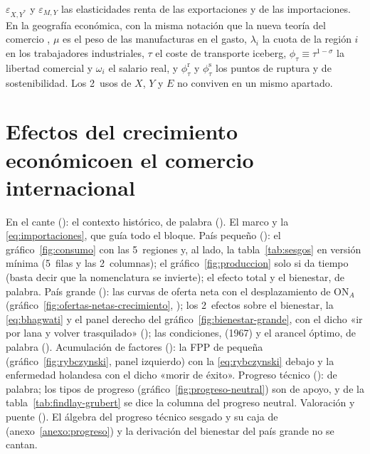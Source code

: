 \documentclass[11pt]{article}
\begin{document}
\begin{anotaciones}
$\varepsilon_{X,Y^*}$ y $\varepsilon_{M,Y}$ las elasticidades renta de las exportaciones y de las importaciones. En la geografía económica, con la misma notación que la nueva teoría del comercio , $\mu$ es el peso de las manufacturas en el gasto, $\lambda_i$ la cuota de la región $i$ en los trabajadores industriales, $\tau$ el coste de transporte iceberg, $\phi_\tau\equiv\tau^{1-\sigma}$ la libertad comercial y $\omega_i$ el salario real, y $\phi^{\mathrm r}_\tau$ y $\phi^{\mathrm s}_\tau$ los puntos de ruptura y de sostenibilidad. Los 2~usos de $X$, $Y$ y $E$ no conviven en un mismo apartado.
\end{anotaciones}

\section{Efectos del crecimiento económico\newline en el comercio internacional}\label{sec:crecimiento-comercio}

\begin{notaopositor}
En el cante (): el contexto histórico, de palabra (). El marco y la \eqref{eq:importaciones}, que guía todo el bloque. País pequeño (): el gráfico~\ref{fig:consumo} con las 5~regiones y, al lado, la tabla~\ref{tab:sesgos} en versión mínima (5~filas y las 2~columnas); el gráfico~\ref{fig:produccion} solo si da tiempo (basta decir que la nomenclatura se invierte); el efecto total y el bienestar, de palabra. País grande (): las curvas de oferta neta con el desplazamiento de ON$_A$ (gráfico~\ref{fig:ofertas-netas-crecimiento}, ); los 2~efectos sobre el bienestar, la \eqref{eq:bhagwati} y el panel derecho del gráfico~\ref{fig:bienestar-grande}, con el dicho «ir por lana y volver trasquilado» (); las condiciones,  (1967) y el arancel óptimo, de palabra (). Acumulación de factores (): la FPP de  pequeña (gráfico~\ref{fig:rybczynski}, panel izquierdo) con la \eqref{eq:rybczynski} debajo y la enfermedad holandesa con el dicho «morir de éxito». Progreso técnico (): de palabra; los tipos de progreso (gráfico~\ref{fig:progreso-neutral}) son de apoyo, y de la tabla~\ref{tab:findlay-grubert} se dice la columna del progreso neutral. Valoración y puente (). El álgebra del progreso técnico sesgado y su caja de  (anexo~\ref{anexo:progreso}) y la derivación del bienestar del país grande no se cantan.
\end{notaopositor}
\end{document}
